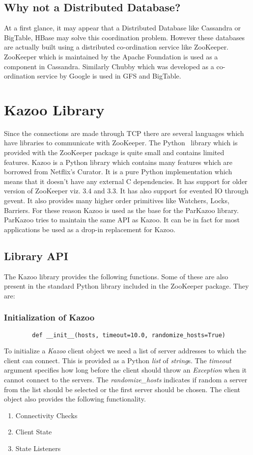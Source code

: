 \subsection{Why not a Distributed Database?}
At a first glance, it may appear that a Distributed Database like Cassandra or BigTable, HBase may solve this coordination problem. However these databases are actually built using a distributed co-ordination service like ZooKeeper. ZooKeeper which is maintained by the Apache Foundation is used as a component in Cassandra. Similarly Chubby which was developed as a co-ordination service by Google is used in GFS and BigTable.

\section{Kazoo Library}
Since the connections are made through TCP there are several languages which have libraries to communicate with ZooKeeper. The Python~\cite{van2002python} library which is provided with the ZooKeeper package is quite small and contains limited features. Kazoo is a Python library which contains many features which are borrowed from Netflix's Curator. It is a pure Python implementation which means that it doesn't have any external C dependencies. It has support for older version of ZooKeeper viz. 3.4 and 3.3. It has also support for evented IO through gevent. It also provides many higher order primitives like Watchers, Locks, Barriers. For these reason Kazoo is used as the base for the ParKazoo library. ParKazoo tries to maintain the same API as Kazoo. It can be in fact for most applications be used as a drop-in replacement for Kazoo.

\subsection{Library API}
The Kazoo library provides the following functions. Some of these are also present in the standard Python library included in the ZooKeeper package. They are:
  \subsubsection{Initialization of Kazoo}
  	\begin{lstlisting}
  		def __init__(hosts, timeout=10.0, randomize_hosts=True)
  	\end{lstlisting}
  	To initialize a \textit{Kazoo} client object we need a list of server addresses to which the client can connect. This is provided as a Python \textit{list} of \textit{string}s. The \textit{timeout} argument specifies how long before the client should throw an \textit{Exception} when it cannot connect to the servers. The \textit{randomize\_hosts} indicates if random a server from the list should be selected or the first server should be chosen.
	The client object also provides the following functionality.
	\begin{enumerate}
		\item Connectivity Checks
		\item Client State
		\item State Listeners
	\end{enumerate}


